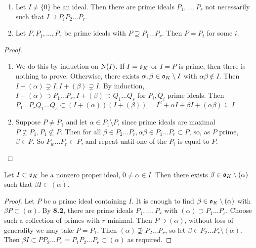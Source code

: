 \documentclass[10pt,a4paper]{article}
\begin{document}
\begin{lemma}
\item
\begin{enumerate}
\item Let $I \neq \{0\}$ be an ideal. Then there are prime ideals $P_1, \ldots, P_r$ not necessarily such that $I \supseteq P_i P_2\ldots P_r$.
\item Let $P, P_1, \ldots, P_r$ be prime ideals with $P \supseteq P_1 \ldots P_r$. Then $P = P_i$ for some $i$.
\end{enumerate}
\end{lemma}
\begin{proof}
\item
\begin{enumerate}
\item We do this by induction on $\operatorname{N}(I)$. If $I = \mathfrak{o}_K$ or $I=P$ is prime, then there is nothing to prove. Otherwise, there exists $\alpha, \beta \in \mathfrak{o}_K \setminus I$ with $\alpha\beta \notin I$. Then $I+(\alpha) \supsetneq I, I+(\beta) \supsetneq I$. By induction, $I+(\alpha) \supset P_1\ldots P_r, I+(\beta) \supset Q_1\ldots Q_s$ for $P_i, Q_i$ prime ideals. Then $P_1\ldots P_r Q_1 \ldots Q_s \subset (I+(\alpha))(I+(\beta)) = I^2 + \alpha I + \beta I + (\alpha\beta) \subseteq I$

\item Suppose $P \neq P_1$ and let $\alpha \in P_1 \setminus P$, since prime ideals are maximal $P \nsubseteq P_1, P_1 \nsubseteq P$. Then for all $\beta \in P_2 \ldots P_r, \alpha\beta \in P_1 \ldots P_r \subset P$, so, as $P$ prime, $\beta \in P$. So $P_w \ldots P_r \subset P$, and repeat until one of the $P_i$ is equal to $P$.
\end{enumerate}
\end{proof}
\begin{corollary}
Let $I \subset \mathfrak{o}_K$ be a nonzero proper ideal, $0 \neq \alpha \in I$. Then there exists $\beta \in \mathfrak{o}_K \setminus (\alpha)$ such that $\beta I \subset (\alpha)$.
\end{corollary}
\begin{proof}
Let $P$ be a prime ideal containing $I$. It is enough to find $\beta \in \mathfrak{o}_K \setminus(\alpha)$ with $\beta P \subset (\alpha)$. By \textbf{8.2}, there are prime ideals $P_1, \ldots, P_r$ with $(\alpha) \supset P_1 \ldots P_r$. Choose such a collection of primes with $r$ minimal. Then $P \supset (\alpha)$, without loss of generality we may take $P = P_1$. Then $(\alpha) \nsupseteq P_2 \ldots P_r$, so let $\beta \in P_2 \ldots P_r \setminus (\alpha)$. Then $\beta I \subset PP_2 \ldots P_r = P_1 P_2 \ldots P_r \subset (\alpha)$ as required.
\end{proof}
\end{document}
